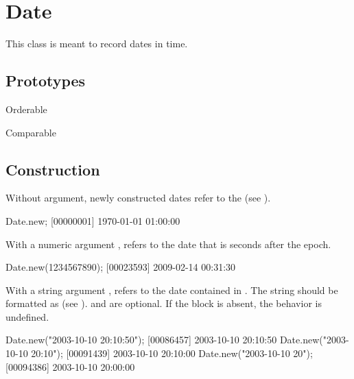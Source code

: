 
\section{Date}

This class is meant to record dates in time.
\experimental{}

\subsection{Prototypes}
\begin{refObjects}
\item[Orderable]
\item[Comparable]
\end{refObjects}

\subsection{Construction}

Without argument, newly constructed dates refer to the  (see
).

\begin{urbiscript}[firstnumber=1]
Date.new;
[00000001] 1970-01-01 01:00:00
\end{urbiscript}

With a numeric argument , refers to the date that is 
seconds after the epoch.

\begin{urbiscript}
Date.new(1234567890);
[00023593] 2009-02-14 00:31:30
\end{urbiscript}

With a string argument , refers to the date contained in .
The string should be formatted as  (see ). 
and  are optional. If the block 
is absent, the behavior is undefined.


\begin{urbiscript}
Date.new("2003-10-10 20:10:50");
[00086457] 2003-10-10 20:10:50
Date.new("2003-10-10 20:10");
[00091439] 2003-10-10 20:10:00
Date.new("2003-10-10 20");
[00094386] 2003-10-10 20:00:00
\end{urbiscript}

